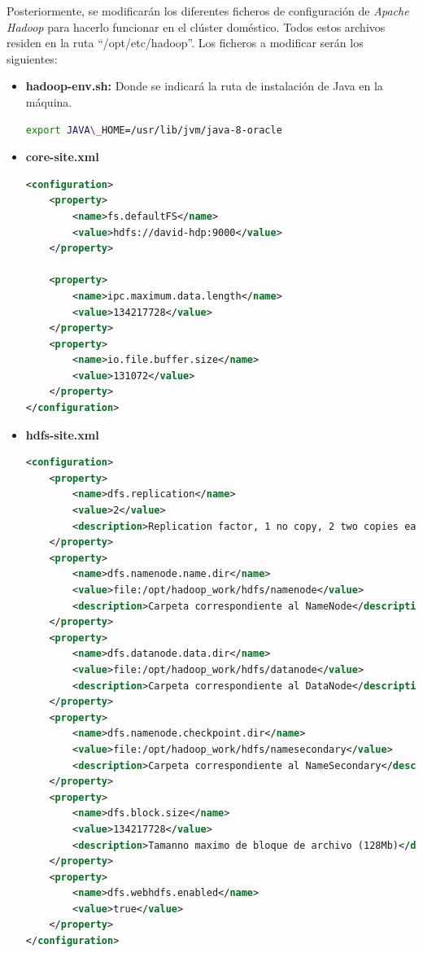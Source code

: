 Posteriormente, se modificarán los diferentes ficheros de configuración de \textit{Apache Hadoop} para hacerlo funcionar en el clúster doméstico. Todos estos archivos residen en la ruta ``/opt/etc/hadoop''. Los ficheros a modificar serán los siguientes:

\begin{itemize}
\item \textbf{hadoop-env.sh:} Donde se indicará la ruta de instalación de Java en la máquina.
\begin{lstlisting}[label=hadoopenv,language=sh,frame=single,caption=Línea a añadir a ``hadoop-env.sh''.]
export JAVA\_HOME=/usr/lib/jvm/java-8-oracle
\end{lstlisting}

\item \textbf{core-site.xml}
\begin{lstlisting}[label=coresite,language=XML,frame=single,caption=Contenido del ``core-site.xml''.]
<configuration>
	<property>
		<name>fs.defaultFS</name>
		<value>hdfs://david-hdp:9000</value>
	</property>
	
	<property>
		<name>ipc.maximum.data.length</name>
		<value>134217728</value>
	</property>
	<property>
		<name>io.file.buffer.size</name>
		<value>131072</value>
	</property>
</configuration>
\end{lstlisting}

\item \textbf{hdfs-site.xml}
\begin{lstlisting}[label=hdfssite1,language=XML,frame=single,caption=Contenido del ``hdfs-site.xml'' de el nodo maestro.]
<configuration>
	<property>
		<name>dfs.replication</name>
		<value>2</value>
		<description>Replication factor, 1 no copy, 2 two copies each fragment</description> 
	</property>
	<property>
		<name>dfs.namenode.name.dir</name>
		<value>file:/opt/hadoop_work/hdfs/namenode</value>
		<description>Carpeta correspondiente al NameNode</description> 
	</property>
	<property>
		<name>dfs.datanode.data.dir</name>
		<value>file:/opt/hadoop_work/hdfs/datanode</value>
		<description>Carpeta correspondiente al DataNode</description> 
	</property>
	<property>
		<name>dfs.namenode.checkpoint.dir</name>
		<value>file:/opt/hadoop_work/hdfs/namesecondary</value>
		<description>Carpeta correspondiente al NameSecondary</description> 
	</property>
	<property>
		<name>dfs.block.size</name>
		<value>134217728</value>
		<description>Tamanno maximo de bloque de archivo (128Mb)</description> 
	</property>
	<property>
		<name>dfs.webhdfs.enabled</name>
		<value>true</value>
	</property>
</configuration>
\end{lstlisting}


\end{itemize}

